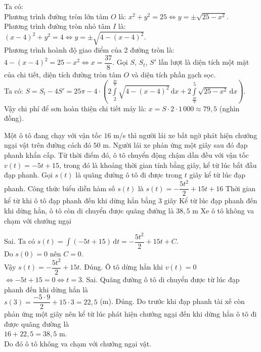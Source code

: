 \begin{ex}
{		Ta có:\\
		Phương trình đường tròn lớn tâm $O$ là: $x^2+y^2=25\Leftrightarrow y=\pm\sqrt{25-x^2}$.\\
		Phương trình đường tròn nhỏ tâm $I$ là: $(x-4)^2+y^2=4\Leftrightarrow y=\pm\sqrt{4-(x-4)^2}$.\\
		Phương trình hoành độ giao điểm của 2 đường tròn là: $4-(x-4)^2=25-x^2\Leftrightarrow x=\dfrac{37}{8}$.
		Gọi $S$, $S_t$, $S'$ lần lượt là diện tích một mặt của chi tiết, diện tích đường tròn tâm $O$ và diện tích phần gạch sọc.\\
		Ta có: $S=S_t-4S'=25\pi -4\cdot \left(2\displaystyle\int\limits _2^{\tfrac{37}{8}}\sqrt{4-(x-4)^2}\mathrm{\, d}x+2\displaystyle\int\limits _{\tfrac{37}{8}}^5\sqrt{25-x^2}\mathrm{\, d}x\right)$.\\
		Vậy chi phí để sơn hoàn thiện chi tiết máy là: $x=S\cdot 2\cdot 1\,000\approx 79{,}5$ (nghìn đồng).
	}
\end{ex}

\begin{ex}%
	Một ô tô đang chạy với vận tốc $16$ m/s thì người lái xe bất ngờ phát hiện chướng ngại vật trên đường cách đó $50$ m. Người lái xe phản ứng một giây sau đó đạp phanh khẩn cấp. Từ thời điểm đó, ô tô chuyển động chậm dần đều với vận tốc $v(t)=-5t+15$, trong đó là khoảng thời gian tính bằng giây, kể từ lúc bắt đầu đạp phanh. Gọi $s(t)$ là quãng đường ô tô đi được trong $t$ giây kể từ lúc đạp phanh.	
	\choiceTF
	{Công thức biểu diễn hàm số $s(t)$ là $s(t)=-\dfrac{5t^2}{2}+15t+16$}
	{\True Thời gian kể từ khi ô tô đạp phanh đến khi dừng hẳn bằng $3$ giây}
	{Kể từ lúc đạp phanh đến khi dừng hẳn, ô tô còn di chuyển được quãng đường là $38{,}5$ m}
	{\True Xe ô tô không va chạm với chướng ngại}
	\loigiai
	{
		\begin{itemchoice}
			\itemch Sai. Ta có $s(t)=\displaystyle\int \left(-5t+15\right)\mathrm{\,d}t=-\dfrac{5t^2}{2}+15t+C$.\\
			Do $s(0)=0$ nên $C=0$.\\
			Vậy $s(t)=-\dfrac{5t^2}{2}+15t$.
			\itemch Đúng. Ô tô dừng hẳn khi $v(t)=0$ $\Leftrightarrow-5t+15=0\Leftrightarrow t=3$.
			\itemch Sai. Quãng đường ô tô di chuyển được từ lúc đạp phanh đến khi dừng hẳn là\\
			$s(3)=\dfrac{-5\cdot 9}{2}+15\cdot 3=22{,}5$ (m). 
			\itemch Đúng. Do trước khi đạp phanh tài xế còn phản ứng một giây nên kể từ lúc phát hiện chướng ngại đến khi dừng hẳn ô tô đi được quãng đường là\\ $16+22{,}5=38{,}5$ m.\\
			Do đó ô tô không va chạm với chướng ngại vật.
		\end{itemchoice}
	}
\end{ex}

